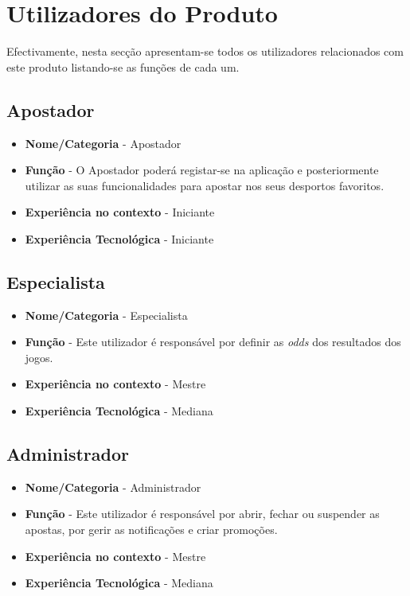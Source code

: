 \chapter{Utilizadores do Produto}

Efectivamente, nesta secção apresentam-se todos os utilizadores relacionados com este produto listando-se as funções de cada um.

\section{Apostador}
\begin{itemize}
    \item \textbf{Nome/Categoria} - Apostador
    \item \textbf{Função} - O Apostador poderá registar-se na aplicação e posteriormente utilizar as suas funcionalidades para apostar nos seus desportos favoritos.
    \item \textbf{Experiência no contexto} - Iniciante
    \item \textbf{Experiência Tecnológica} - Iniciante
\end{itemize}
    
\section{Especialista}
\begin{itemize}
    \item \textbf{Nome/Categoria} - Especialista
    \item \textbf{Função} - Este utilizador é responsável por definir as \textit{odds} dos resultados dos jogos.
    \item \textbf{Experiência no contexto} - Mestre
    \item \textbf{Experiência Tecnológica} - Mediana
\end{itemize}

\section{Administrador}
\begin{itemize}
    \item \textbf{Nome/Categoria} - Administrador
    \item \textbf{Função} - Este utilizador é responsável por abrir, fechar ou suspender as apostas, por gerir as notificações e criar promoções.
    \item \textbf{Experiência no contexto} - Mestre
    \item \textbf{Experiência Tecnológica} - Mediana
\end{itemize}
